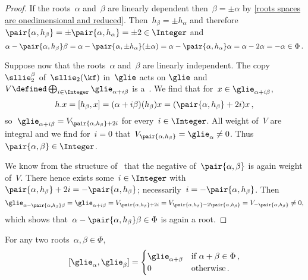 \begin{proof}
  If the roots~$\alpha$ and~$\beta$ are linearly dependent then~$\beta = \pm \alpha$ by \cref{roots spaces are onedimensional and reduced}.
  Then~$h_\beta = \pm h_\alpha$ and therefore~$\pair{\alpha, h_\beta} = \pm \pair{\alpha, h_\alpha} = \pm 2 \in \Integer$ and
  \[
    \alpha - \pair{\alpha, h_\beta} \beta
    =
    \alpha - \pair{\alpha, \pm h_\alpha} (\pm \alpha)
    =
    \alpha - \pair{\alpha, h_\alpha} \alpha
    =
    \alpha - 2 \alpha
    =
    -\alpha \in \Phi  \,.
  \]
 
  Suppose now that the roots~$\alpha$ and~$\beta$ are linearly independent.
  The copy~$\sllie_2^\beta$ of~$\sllie_2(\kf)$ in~$\glie$ acts on $\glie$ and~$V \defined \bigoplus_{i \in \Integer} \glie_{\alpha+i\beta}$ is a~{}.
  We find that for~$x \in \glie_{\alpha + i \beta}$,
  \[
    h.x
    =
    [h_\beta, x]
    =
    (\alpha + i\beta)(h_\beta)x
    =
    (\pair{\alpha, h_\beta} + 2i) x \,,
  \]
  so~$\glie_{\alpha+i\beta} = V_{\pair{\alpha, h_\beta}+2i}$ for every~$i \in \Integer$.
  All weight of~$V$ are integral and we find for~$i = 0$ that~$V_{\pair{\alpha, h_\beta}} = \glie_\alpha \neq 0$.
  Thus~$\pair{\alpha, \beta} \in \Integer$.
  
  We know from the structure of~{} that the negative of~$\pair{\alpha, \beta}$ is again weight of~$V$.
  There hence exists some~$i \in \Integer$ with~$\pair{\alpha, h_\beta} + 2i = -\pair{\alpha, h_\beta}$;
  necessarily~$i = -\pair{\alpha, h_\beta}$.
  Then
  \[
    \glie_{\alpha - \pair{\alpha, h_\beta} \beta}
    =
    \glie_{\alpha + i \beta}
    =
    V_{\pair{\alpha, h_\beta}+2i}
    =
    V_{\pair{\alpha, h_\beta} - 2\pair{\alpha, h_\beta}}
    =
    V_{-\pair{\alpha, h_\beta}}
    \neq
    0,
  \]
  which shows that~$\alpha - \pair{\alpha, h_\beta} \beta \in \Phi$ is again a root.
\end{proof}


\begin{corollary}
  For any two roots~$\alpha, \beta \in \Phi$,
  \[
    [\glie_\alpha, \glie_\beta]
    =
    \begin{cases}
    \glie_{\alpha+\beta}  & \text{if $\alpha+\beta \in \Phi$} \,, \\
    0                     & \text{otherwise}  \,.
    \end{cases}
  \]
\end{corollary}


